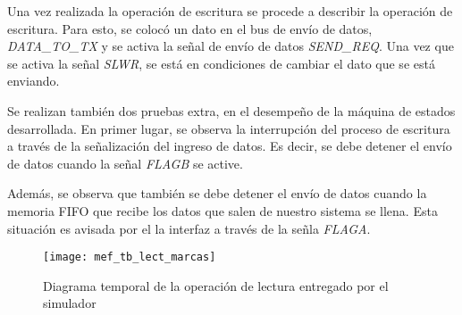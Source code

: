 Una vez realizada la operación de escritura se procede a describir la operación de escritura. Para esto, se colocó un dato en el bus de envío de datos, {\it DATA\_TO\_TX} y se activa la señal de envío de datos {\it SEND\_REQ}. Una vez que se activa la señal {\it SLWR}, se está en condiciones de cambiar el dato que se está enviando.

Se realizan también dos pruebas extra, en el desempeño de la máquina de estados desarrollada. En primer lugar, se observa la interrupción del proceso de escritura a través de la señalización del ingreso de datos. Es decir, se debe detener el envío de datos cuando la señal {\it FLAGB} se active.

Además, se observa que también se debe detener el envío de datos cuando la memoria FIFO que recibe los datos que salen de nuestro sistema se llena. Esta situación es avisada por el la interfaz a través de la señla {\it FLAGA}.

%
%	
%
%
%
%
%		
%
%
%
%
%		

\begin{figure}[ht]
	\centering
	\texttt{[image: mef\_tb\_lect\_marcas]}
	\caption{Diagrama temporal de la operación de lectura entregado por el simulador}
	\label{tb:lect}
\end{figure}

